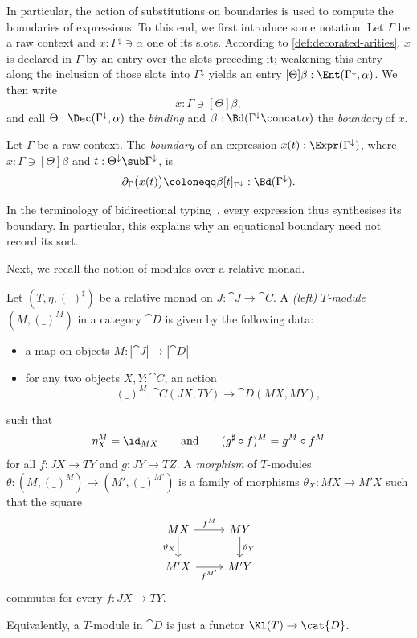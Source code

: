 In particular, the action of substitutions on boundaries is used to compute the boundaries of expressions. To this end, we first introduce some notation. Let $\Gamma$ be a raw context and $x : \Gamma^{\downarrow} \ni \alpha$ one of its slots. According to \cref{def:decorated-arities}, $x$ is declared in $\Gamma$ by an entry over the slots preceding it; weakening this entry along the inclusion of those slots into $\Gamma^{\downarrow}$ yields an entry $[\Theta]\beta : \Ent(\Gamma^{\downarrow}, \alpha)$. We then write
\[
x : \Gamma \ni [\Theta]\beta,
\]
and call $\Theta : \Dec(\Gamma^{\downarrow}, \alpha)$ the \emph{binding} and $\beta : \Bd(\Gamma^{\downarrow} \concat \alpha)$ the \emph{boundary} of $x$.

\begin{definition}\label{def:boundary-of-expression}
    Let $\Gamma$ be a raw context. The \emph{boundary} of an expression $x(t) : \Expr(\Gamma^{\downarrow})$, where $x : \Gamma \ni [\Theta]\beta$ and $t : \Theta^{\downarrow} \sub \Gamma^{\downarrow}$, is
    \[
    \partial_\Gamma\big(x(t)\big) \coloneqq \beta[t]_{\Gamma^{\downarrow}} : \Bd(\Gamma^{\downarrow}).
    \]
\end{definition}

In the terminology of bidirectional typing~\cite{McBride2019Ni}, every expression thus synthesises its boundary. In particular, this explains why an equational boundary need not record its sort.

Next, we recall the notion of modules over a relative monad. 

\begin{definition}\label{def:module}
    Let $(T, \eta, (\_)^\sharp)$ be a relative monad on $J : \cat{J} \to \cat{C}$. A \emph{(left) $T$-module} $(M, (\_)^M)$ in a category $\cat{D}$ is given by the following data:
    \begin{itemize}
        \item a map on objects $M : \left|\cat{J}\right| \to \left|\cat{D}\right|$
        \item for any two objects $X,Y : \cat{C}$, an action $$(\_)^M : \cat{C}(JX,TY) \to \cat{D}(MX,MY),$$
    \end{itemize}
    such that 
    \[
    \eta_X^M = \id_{MX} \qquad \text{and} \qquad (g^\sharp \circ f)^M = g^M \circ f^M
    \]
    for all $f : JX \to TY$ and $g : JY \to TZ$. A \emph{morphism} of $T$-modules $\theta : (M, (\_)^M) \to (M', (\_)^{M'})$ is a family of morphisms $\theta_X : MX \to M'X$ such that the square
    \[\begin{tikzcd}
    	MX & MY \\
    	{M'X} & {M'Y}
    	\arrow["{f^M}", from=1-1, to=1-2]
    	\arrow["{\vartheta_X}"', from=1-1, to=2-1]
    	\arrow["{\vartheta_Y}", from=1-2, to=2-2]
    	\arrow["{f^{M'}}"', from=2-1, to=2-2]
    \end{tikzcd}\]
    commutes for every $f : JX \to TY$.

    Equivalently, a $T$-module in $\cat{D}$ is just a functor $\Kl(T) \to \cat{D}$.
\end{definition}


